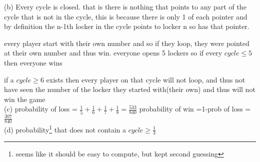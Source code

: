 \documentclass{article}
\newcounter{prob}\setcounter{prob}{1}\newcommand{\prob}{\arabic{prob}.\indent \addtocounter{prob}{1}}
\begin{document}
(b) Every cycle is closed. that is there is nothing that points to any part of the cycle that is not in the cycle, this is because there is only 1 of each pointer and by  definition the n-1th locker in the cycle points to locker n so has that pointer.

every player start with their own number and so if they loop, they were pointed at their own number and thus win. everyone opens 5 lockers so if every $cycle \leq 5$ then everyone wins

if a $cycle \geq 6$ exists then every player on that cycle will not loop, and 
thus not have seen the number of the locker they started with(their own) and thus will not win the game\\

(c) probability of loss = $\frac{1}{5}+\frac{1}{6}+\frac{1}{7}+\frac{1}{8}=\frac{533}{840}$
probability of win =1-prob of loss = $\frac{307}{840}$\\

(d) probability\footnote{seems like it should be easy to compute, but kept second guessing} that does not contain a $cycle \geq \frac{1}{3}$ 
\end{document}
